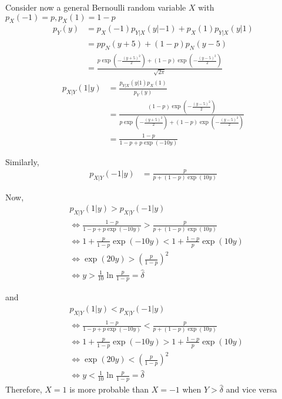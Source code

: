 \documentclass[journal,12pt,twocolumn]{IEEEtran}
\providecommand{\brak}[1]{\ensuremath{\left(#1\right)}}
\numberwithin{equation}{section}
\renewcommand\thesection{\arabic{section}}
\begin{document}
\begin{enumerate}[label=\thesection.\arabic*,ref=\thesection.\theenumi]
	Consider now a general Bernoulli random variable $X$ with $p_X(-1) = p, p_X(1) = 1-p$
	\begin{align}
		p_Y(y) &= p_X(-1) p_{Y|X}(y|-1) + p_X(1) p_{Y|X}(y|1) \\
		&= p p_N(y+5) + (1-p) p_N(y-5) \\
		&= \frac{p\exp\brak{-\frac{(y+5)^2}{2}} + (1-p)\exp\brak{-\frac{(y-5)^2}{2}}}{\sqrt{2\pi}}
	\end{align}
	\begin{align}
		p_{X|Y}(1|y) &= \frac{p_{Y|X}(y|1) p_X(1)}{p_Y(y)} \\
		&= \frac{(1-p)\exp\brak{-\frac{(y-5)^2}{2}}}{p\exp\brak{-\frac{(y+5)^2}{2}} + (1-p)\exp\brak{-\frac{(y-5)^2}{2}}} \\
		&= \frac{1-p}{1-p + p\exp(-10y)}
	\end{align}
	
	Similarly,
	\begin{align}
		p_{X|Y}(-1|y) &= \frac{p}{p + (1-p)\exp(10y)}
	\end{align}
	
	Now,
	\begin{align}
		&p_{X|Y}(1|y) > p_{X|Y}(-1|y) \\
		&\iff \frac{1-p}{1-p + p\exp(-10y)} > \frac{p}{p + (1-p)\exp(10y)} \\
		&\iff 1 + \frac{p}{1-p}\exp(-10y) < 1 + \frac{1-p}{p}\exp(10y) \\
		&\iff \exp(20y) > \brak{\frac{p}{1-p}}^2 \\
		&\iff y > \frac{1}{10} \ln\frac{p}{1-p} = \hat{\delta}
	\end{align}
	
	and
	\begin{align}
		&p_{X|Y}(1|y) < p_{X|Y}(-1|y) \\
		&\iff \frac{1-p}{1-p + p\exp(-10y)} < \frac{p}{p + (1-p)\exp(10y)} \\
		&\iff 1 + \frac{p}{1-p}\exp(-10y) > 1 + \frac{1-p}{p}\exp(10y) \\
		&\iff \exp(20y) < \brak{\frac{p}{1-p}}^2 \\
		&\iff y < \frac{1}{10} \ln\frac{p}{1-p} = \hat{\delta}
	\end{align}
	Therefore, $X=1$ is more probable than $X=-1$ when $Y>\hat{\delta}$ and vice versa
	\end{enumerate}
\end{document}
